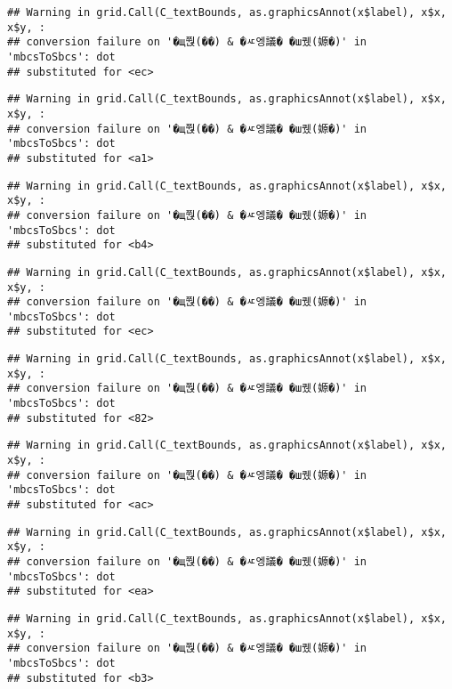 \documentclass[
]{article}
\begin{document}
\begin{verbatim}
## Warning in grid.Call(C_textBounds, as.graphicsAnnot(x$label), x$x, x$y, :
## conversion failure on '�щ쭩(��) & �ㅼ엥議� �ш퀬(嫄�)' in 'mbcsToSbcs': dot
## substituted for <ec>
\end{verbatim}

\begin{verbatim}
## Warning in grid.Call(C_textBounds, as.graphicsAnnot(x$label), x$x, x$y, :
## conversion failure on '�щ쭩(��) & �ㅼ엥議� �ш퀬(嫄�)' in 'mbcsToSbcs': dot
## substituted for <a1>
\end{verbatim}

\begin{verbatim}
## Warning in grid.Call(C_textBounds, as.graphicsAnnot(x$label), x$x, x$y, :
## conversion failure on '�щ쭩(��) & �ㅼ엥議� �ш퀬(嫄�)' in 'mbcsToSbcs': dot
## substituted for <b4>
\end{verbatim}

\begin{verbatim}
## Warning in grid.Call(C_textBounds, as.graphicsAnnot(x$label), x$x, x$y, :
## conversion failure on '�щ쭩(��) & �ㅼ엥議� �ш퀬(嫄�)' in 'mbcsToSbcs': dot
## substituted for <ec>
\end{verbatim}

\begin{verbatim}
## Warning in grid.Call(C_textBounds, as.graphicsAnnot(x$label), x$x, x$y, :
## conversion failure on '�щ쭩(��) & �ㅼ엥議� �ш퀬(嫄�)' in 'mbcsToSbcs': dot
## substituted for <82>
\end{verbatim}

\begin{verbatim}
## Warning in grid.Call(C_textBounds, as.graphicsAnnot(x$label), x$x, x$y, :
## conversion failure on '�щ쭩(��) & �ㅼ엥議� �ш퀬(嫄�)' in 'mbcsToSbcs': dot
## substituted for <ac>
\end{verbatim}

\begin{verbatim}
## Warning in grid.Call(C_textBounds, as.graphicsAnnot(x$label), x$x, x$y, :
## conversion failure on '�щ쭩(��) & �ㅼ엥議� �ш퀬(嫄�)' in 'mbcsToSbcs': dot
## substituted for <ea>
\end{verbatim}

\begin{verbatim}
## Warning in grid.Call(C_textBounds, as.graphicsAnnot(x$label), x$x, x$y, :
## conversion failure on '�щ쭩(��) & �ㅼ엥議� �ш퀬(嫄�)' in 'mbcsToSbcs': dot
## substituted for <b3>
\end{verbatim}
\end{document}
